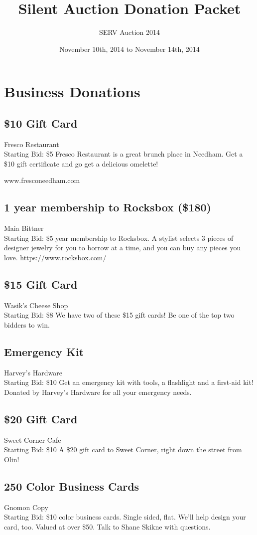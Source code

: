 \documentclass[11pt]{article}
\title{Silent Auction Donation Packet}
\author{SERV Auction 2014}
\date{November 10th, 2014 to November 14th, 2014}
\begin{document}
\maketitle
\section{Business Donations}
\subsection{\$10 Gift Card}
Fresco Restaurant
\\
Starting Bid: \$5
\newline
Fresco Restaurant is a great brunch place in Needham. Get a \$10 gift certificate and go get a delicious omelette!

www.fresconeedham.com
\subsection{1 year membership to Rocksbox (\$180)}
Maia Bittner
\\
Starting Bid: \$5
 year membership to Rocksbox. A stylist selects 3 pieces of designer jewelry for you to borrow at a time, and you can buy any pieces you love.  https://www.rocksbox.com/
\subsection{\$15 Gift Card}
Wasik's Cheese Shop
\\
Starting Bid: \$8
\newline
We have two of these \$15 gift cards! Be one of the top two bidders to win.
\subsection{Emergency Kit}
Harvey's Hardware
\\
Starting Bid: \$10
\newline
Get an emergency kit with tools, a flashlight and a first-aid kit! Donated by Harvey's Hardware for all your emergency needs.
\subsection{\$20 Gift Card}
Sweet Corner Cafe
\\
Starting Bid: \$10
\newline
A \$20 gift card to Sweet Corner, right down the street from Olin!
\subsection{250 Color Business Cards}
Gnomon Copy
\\
Starting Bid: \$10
 color business cards. Single sided, flat. We'll help design your card, too. Valued at over \$50. Talk to Shane Skikne with questions.
\end{document}
